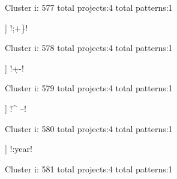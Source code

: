 Cluster i: 577
total projects:4
total patterns:1
\begin{multicols}{1}
\begin{description}[noitemsep,topsep=0pt]
\item [[4] ] \cverb!;+\}!
\end{description}
\end{multicols}







Cluster i: 578
total projects:4
total patterns:1
\begin{multicols}{1}
\begin{description}[noitemsep,topsep=0pt]
\item [[4] ] \cverb!\d+-!
\end{description}
\end{multicols}







Cluster i: 579
total projects:4
total patterns:1
\begin{multicols}{1}
\begin{description}[noitemsep,topsep=0pt]
\item [[4] ] \cverb!^  --!
\end{description}
\end{multicols}







Cluster i: 580
total projects:4
total patterns:1
\begin{multicols}{1}
\begin{description}[noitemsep,topsep=0pt]
\item [[4] ] \cverb!:year!
\end{description}
\end{multicols}







Cluster i: 581
total projects:4
total patterns:1
\begin{multicols}{1}
\begin{description}[noitemsep,topsep=0pt]
\item [[4] ] \cverb!^_|_$!
\end{description}
\end{multicols}







